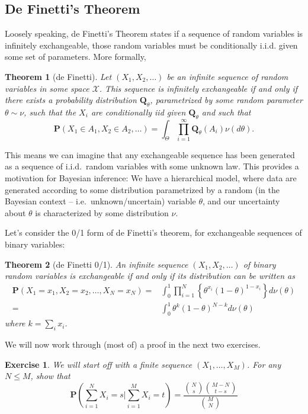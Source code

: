 \documentclass[twoside]{article}
\newcounter{lecnum}
\newtheorem{theorem}{Theorem}[lecnum]
\newtheorem{exercise}{Exercise}[lecnum]
\newcommand\Prob{\mathbf{P}}
\newcommand\Q{\mathbf{Q}}
\begin{document}
\subsection{De Finetti's Theorem}

Loosely speaking, de Finetti's Theorem states if a sequence of random variables is infinitely exchangeable, those random variables must be conditionally i.i.d. given some set of parameters. More formally,

\begin{theorem}[de Finetti]
  Let $(X_1,X_2,\dots)$ be an infinite sequence of random variables in some space $\mathcal{X}$. This sequence is infinitely exchangeable if and only if there exists a probability distribution $\Q_\theta$, parametrized by some random parameter $\theta\sim \nu$, such that the $X_i$ are conditionally iid given $\Q_\theta$ and such that
$$\Prob(X_1\in A_1,X_2\in A_2,\dots) = \int_{\Theta}\prod_{i=1}^\infty \Q_\theta(A_i) \nu(d\theta).$$
\end{theorem}

This means we can imagine that any exchangeable sequence has been generated as a sequence of i.i.d.\ random variables with some unknown law. This provides a motivation for Bayesian inference: We have a hierarchical model, where data are generated according to some distribution parametrized by a random (in the Bayesian context -- i.e.\ unknown/uncertain) variable $\theta$, and our uncertainty about $\theta$ is characterized by some distribution $\nu$.

Let's consider the 0/1 form of de Finetti's theorem, for exchangeable sequences of binary variables:


\begin{theorem}[de Finetti 0/1]
  An infinite sequence $(X_1,X_2,\dots)$ of binary random variables is exchangeable if and only if its distribution can be written as
  $$\begin{aligned}\Prob(X_1=x_1,X_2=x_2,\dots, X_N=x_N)  =& \int_0^1\prod_{i=1}^N\left\{\theta^{x_i}(1-\theta)^{1-x_i}\right\} d\nu(\theta)\\
    =&\int_0^1 \theta^{k}(1-\theta)^{N-k} d\nu(\theta)\end{aligned}$$
  where $k=\sum_ix_i$.
\end{theorem}

We will now work through (most of) a proof in the next two exercises.

\begin{exercise}
  We will start off with a finite sequence $(X_1,\dots, X_M)$. For any $N\leq M$, show that
  $$\Prob\left(\sum_{i=1}^N X_i = s\Big|\sum_{i=1}^M X_i = t\right) = \frac{{N\choose s}{M-N\choose t-s}}{{M \choose N}}$$
\end{exercise}
\end{document}
